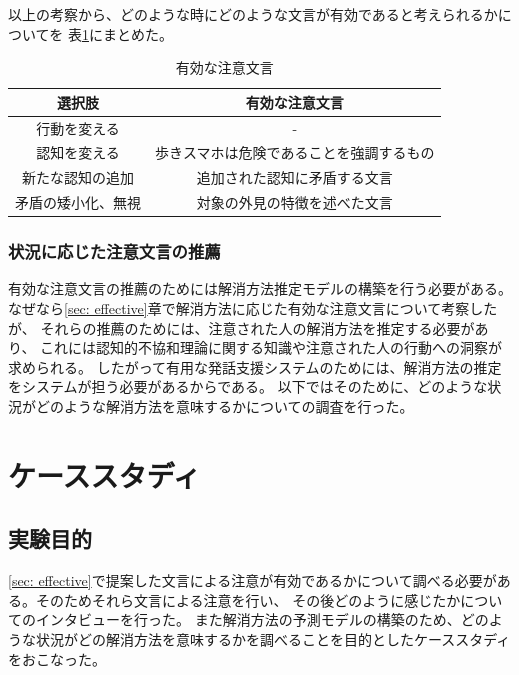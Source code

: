 \documentclass{kuisthesis}
\begin{document}
\vspace{5mm}
以上の考察から、どのような時にどのような文言が有効であると考えられるかについてを
表\ref{fig: EffectiveWords}にまとめた。
\begin{table}[H]
  \centering
  \caption{有効な注意文言}
  \label{fig: EffectiveWords}
  \begin{tabular}{c|c|c|c}
      \multicolumn{2}{c|}{選択肢} & \multicolumn{2}{c}{有効な注意文言} \\ \hline
      \multicolumn{2}{c|}{行動を変える} & \multicolumn{2}{c}{-} \\ \hline
      \multicolumn{2}{c|}{認知を変える} & \multicolumn{2}{c}{歩きスマホは危険であることを強調するもの} \\ \hline
      \multicolumn{2}{c|}{新たな認知の追加} & \multicolumn{2}{c}{追加された認知に矛盾する文言} \\ \hline
      \multicolumn{2}{c|}{矛盾の矮小化、無視} & \multicolumn{2}{c}{対象の外見の特徴を述べた文言} \\
  \end{tabular}
\end{table}

\subsubsection{状況に応じた注意文言の推薦}
\label{sec: recommend}
有効な注意文言の推薦のためには解消方法推定モデルの構築を行う必要がある。
なぜなら\ref{sec: effective}章で解消方法に応じた有効な注意文言について考察したが、
それらの推薦のためには、注意された人の解消方法を推定する必要があり、
これには認知的不協和理論に関する知識や注意された人の行動への洞察が求められる。
したがって有用な発話支援システムのためには、解消方法の推定をシステムが担う必要があるからである。
以下ではそのために、どのような状況がどのような解消方法を意味するかについての調査を行った。


\section{ケーススタディ}
\subsection{実験目的}
\ref{sec: effective}で提案した文言による注意が有効であるかについて調べる必要がある。そのためそれら文言による注意を行い、
その後どのように感じたかについてのインタビューを行った。
また解消方法の予測モデルの構築のため、どのような状況がどの解消方法を意味するかを調べることを目的としたケーススタディをおこなった。
\end{document}
